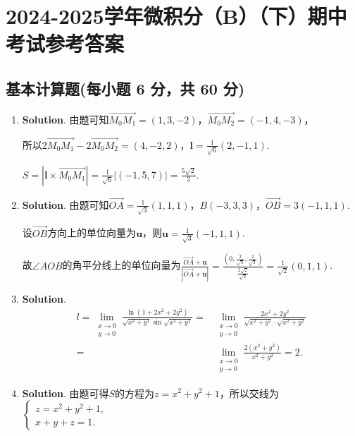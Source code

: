 \documentclass[../Main.tex]{subfiles}
\begin{document}
\chapter{2024-2025学年微积分（B）（下）期中考试参考答案}
\section{基本计算题(每小题 6 分，共 60 分)}
\begin{enumerate}
    \item \textbf{Solution}. 由题可知$\overrightarrow{M_0M_1}=(1,3,-2)$，$\overrightarrow
              {M_0M_2}=(-1,4,-3)$，

          所以$2\overrightarrow{M_0M_1}-2\overrightarrow{M_0M_2}=(4,-2,2)$，$\boldsymbol
              {l}=\frac{1}{\sqrt{6}}(2,-1,1)$.

          $S=|\boldsymbol{l}\times\overrightarrow{M_0M_1}|=\frac{1}{\sqrt{6}}|(-1,5,7
              )|=\frac{5\sqrt{2}}{2}$.

    \item \textbf{Solution}. 由题可知$\overrightarrow{OA}=\frac{1}{\sqrt{3}}(1,1,
              1)$，$B(-3,3,3)$，$\overrightarrow{OB}=3(-1,1,1)$.

          设$\overrightarrow{OB}$方向上的单位向量为$\boldsymbol{u}$，则$\boldsymbol{u}
              =\frac{1}{\sqrt{3}}(-1,1,1)$.

          故$\angle AOB$的角平分线上的单位向量为$\frac{\overrightarrow{OA}+\boldsymbol{u}}{|\overrightarrow{OA}+\boldsymbol{u}|}
              =\frac{(0,\frac{2}{\sqrt{3}},\frac{2}{\sqrt{3}})}{\frac{2\sqrt{2}}{\sqrt{3}}}
              =\frac{1}{\sqrt{2}}(0,1,1)$.

    \item \textbf{Solution}.
          \[
              \begin{aligned}
                  l = \lim_{\substack{x\to 0 \\ y\to 0}}\frac{\ln\left(1+2x^2+2y^2\right)}{\sqrt{x^2+y^2}\sin\sqrt{x^2+y^2}}= & \lim_{\substack{x\to 0 \\ y\to 0}}\frac{2x^2+2y^2}{\sqrt{x^2+y^2}\cdot\sqrt{x^2+y^2}} \\
                  =                                                                                                           & \lim_{\substack{x\to 0 \\ y\to 0}}\frac{2(x^2+y^2)}{x^2+y^2}=2.
              \end{aligned}
          \]

    \item \textbf{Solution}. 由题可得$S$的方程为$z=x^{2}+y^{2}+1$，所以交线为$\begin{cases}
                  z=x^{2}+y^{2}+1, \\
                  x+y+z=1.
              \end{cases}$


\end{enumerate}
\end{document}
